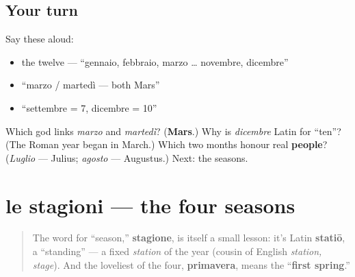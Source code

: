 \subsection*{Your turn}
Say these aloud:

\begin{itemize}
\raggedright
  \item the twelve — \textquotedblleft{}gennaio, febbraio, marzo … novembre, dicembre\textquotedblright{}
  \item \textquotedblleft{}marzo / martedì — both Mars\textquotedblright{}
  \item \textquotedblleft{}settembre = 7, dicembre = 10\textquotedblright{}
\end{itemize}

\begin{tcolorbox}[breakable,colback=teal!4,colframe=teal!35!black,title={Before you move on}]
Which god links \emph{marzo} and \emph{martedì}? (\textbf{Mars}.) Why is \emph{dicembre} Latin for \textquotedblleft{}ten\textquotedblright{}? (The Roman year began in March.) Which two months honour real \textbf{people}? (\emph{Luglio} — Julius; \emph{agosto} — Augustus.) Next: the seasons.
\end{tcolorbox}
\section[le stagioni]{le stagioni — the four seasons}

\label{lesson:IT-C09-stagioni}



\begin{quote}
The word for \textquotedblleft{}season,\textquotedblright{} \textbf{stagione}, is itself a small lesson: it's Latin \textbf{statiō}, a \textquotedblleft{}standing\textquotedblright{} — a fixed \emph{station} of the year (cousin of English \emph{station, stage}). And the loveliest of the four, \textbf{primavera}, means the \textquotedblleft{}\textbf{first spring}.\textquotedblright{}
\end{quote}


